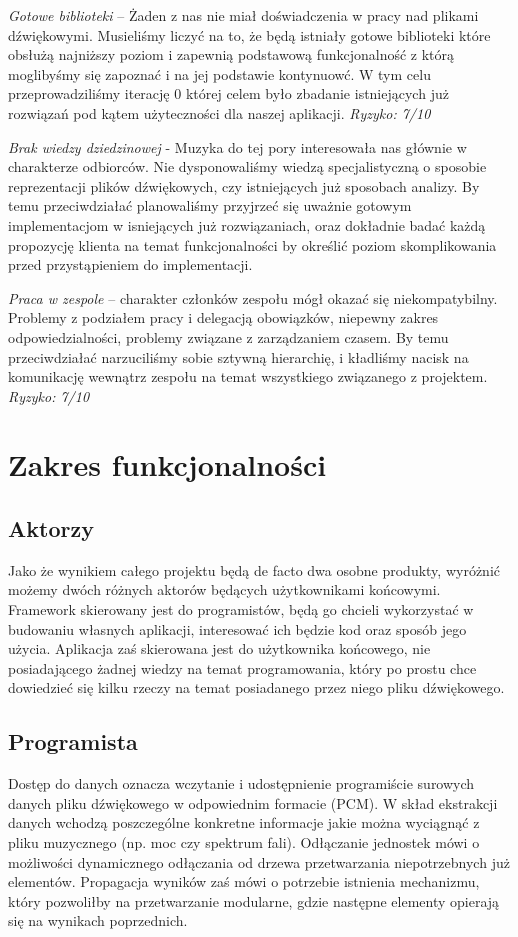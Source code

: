 \noindent\emph{Gotowe biblioteki} -- Żaden z nas nie miał doświadczenia w pracy nad plikami dźwiękowymi. Musieliśmy liczyć na to, że będą istniały gotowe biblioteki które obsłużą najniższy poziom i zapewnią podstawową funkcjonalność z którą moglibyśmy się zapoznać i na jej podstawie kontynuowć. W tym celu przeprowadziliśmy iterację 0 której celem było zbadanie istniejących już rozwiązań pod kątem użyteczności dla naszej aplikacji. \emph{Ryzyko: 7/10}

\noindent\emph{Brak wiedzy dziedzinowej} - Muzyka do tej pory interesowała nas głównie w charakterze odbiorców. Nie dysponowaliśmy wiedzą specjalistyczną o sposobie reprezentacji plików dźwiękowych, czy istniejących już sposobach analizy. By temu przeciwdziałać planowaliśmy przyjrzeć się uważnie gotowym implementacjom w isniejących już rozwiązaniach, oraz dokładnie badać każdą propozycję klienta na temat funkcjonalności by określić poziom skomplikowania przed przystąpieniem do implementacji.

\noindent\emph{Praca w zespole} -- charakter członków zespołu mógł okazać się niekompatybilny. Problemy z podziałem pracy i delegacją obowiązków, niepewny zakres odpowiedzialności, problemy związane z zarządzaniem czasem. By temu przeciwdziałać narzuciliśmy sobie sztywną hierarchię, i kładliśmy nacisk na komunikację wewnątrz zespołu na temat wszystkiego związanego z projektem. \emph{Ryzyko: 7/10} 
 
\chapter{Zakres funkcjonalności}
\section{Aktorzy}
Jako że wynikiem całego projektu będą de facto dwa osobne produkty, wyróżnić możemy dwóch różnych aktorów będących użytkownikami końcowymi. Framework skierowany jest do programistów, będą go chcieli wykorzystać w budowaniu własnych aplikacji, interesować ich będzie kod oraz sposób jego użycia. Aplikacja zaś skierowana jest do użytkownika końcowego, nie posiadającego żadnej wiedzy na temat programowania, który po prostu chce dowiedzieć się kilku rzeczy na temat posiadanego przez niego pliku dźwiękowego.
\section{Programista}
Dostęp do danych oznacza wczytanie i udostępnienie programiście surowych danych pliku dźwiękowego w odpowiednim formacie (PCM).
W skład ekstrakcji danych wchodzą poszczególne konkretne informacje jakie można wyciągnąć z pliku muzycznego (np. moc czy spektrum fali). Odłączanie jednostek mówi o możliwości dynamicznego odłączania od drzewa przetwarzania niepotrzebnych już elementów. Propagacja wyników zaś mówi o potrzebie istnienia mechanizmu, który pozwoliłby na przetwarzanie modularne, gdzie następne elementy opierają się na wynikach poprzednich.

